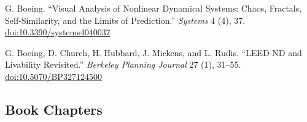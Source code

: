 \documentclass[11pt,a4paper]{report} %
\begin{document}
\begin{tablist}
\item[2016] \tab{}G. Boeing. \enquote{Visual Analysis of Nonlinear Dynamical Systems: Chaos, Fractals, Self-Similarity, and the Limits of Prediction.} \textit{Systems} 4 (4), 37. \href{https://doi.org/10.3390/systems4040037}{doi:10.3390/systems4040037}

\item[2014] \tab{}G. Boeing, D. Church, H. Hubbard, J. Mickens, and L. Rudis. \enquote{LEED-ND and Livability Revisited.} \textit{Berkeley Planning Journal} 27 (1), 31--55. \href{https://doi.org/10.5070/BP327124500}{doi:10.5070/BP327124500}

\end{tablist}

\subsection*{Book Chapters}
\end{document}
